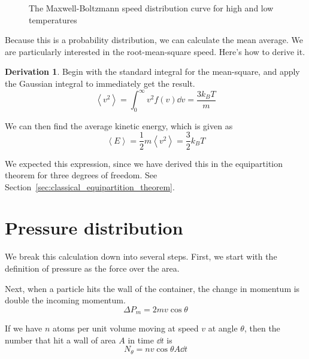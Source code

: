 \documentclass[12pt,chapterprefix=false,dvipsnames]{scrbook}
\theoremstyle{dotless}
\theoremstyle{definition}
\newtheorem{protoderivation}{Derivation}[section]
\newenvironment{derivation}
{\colorlet{shadecolor}{purple!15}\begin{shaded}\begin{protoderivation}}
			{\end{protoderivation}\end{shaded}}
\begin{document}
\begin{figure}[htpb]
	\centering
	
	\caption{The Maxwell-Boltzmann speed distribution curve for high and low
		temperatures}%
	\label{fig:maxwell_boltzmann_speed_distribution}
\end{figure}

Because this is a probability distribution, we can calculate the
mean average. We are particularly interested in the
root-mean-square speed. Here's how to derive it.

\begin{derivation}
	Begin with the standard integral for the mean-square, and apply
	the Gaussian integral to immediately get the result.
	\begin{equation}
		\left<v^2\right>
		=
		\int^{\infty}_0 v^2
		f\left(v\right)\dd{v} =
		\frac{3k_B T}{m}
	\end{equation}

	We can then find the average kinetic energy, which is given as
	\begin{equation}
		\left<E\right>
		=
		\frac{1}{2}m\left<v^2\right>
		=
		\frac{3}{2}k_B T
	\end{equation}

	We expected this expression, since we have derived this in the
	equipartition theorem for three degrees of freedom. See
	Section~\ref{sec:classical_equipartition_theorem}.
\end{derivation}

\section{Pressure distribution}%
\label{sec:pressure_distribution}

We break this calculation down into several steps. First, we
start with the definition of pressure as the force over the
area.

Next, when a particle hits the wall of the container, the change
in momentum is double the incoming momentum.
\begin{equation}
	\Delta P_m = 2mv\cos{\theta}
\end{equation}

If we have $n$ atoms per unit volume moving
at speed $v$ at angle
$\theta$, then the number that hit a wall of area
$A$ in time $\dd{t}$ is
\begin{equation}
	N_{\theta} = nv\cos{\theta}A\dd{t}
\end{equation}
\end{document}

